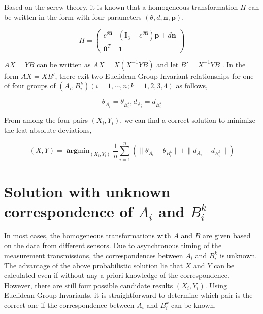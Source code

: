 \documentclass[conference,letterpaper]{IEEEtran}
\begin{document}
Based on the screw theory, it is known that a homogeneous transformation $H$ can be written in the form with four parameters $(\theta,d,\mathbf{n},\mathbf{p})$.

\begin{equation}\label{equ21}
H = \left( \begin{array}{cc}
       e^{\theta \hat{\mathbf{n}}} & (\mathbf{I}_{3} - e^{\theta \hat{\mathbf{n}}})\mathbf{p} + d\mathbf{n} \\
       \mathbf{0}^{T} & \mathbf{1}
\end{array} \right)
\end{equation}

$AX=YB$ can be written as $AX=X(X^{-1}YB)$ and let $B' = X^{-1}YB$ . In the form $AX=XB'$, there exit two Euclidean-Group Invariant relationships for one of four groups of $(A_{i},B_{i}^k)( i = 1,\cdots,n; k=1,2,3,4)$ as follows,

\begin{equation}\label{equ22}
    \theta_{A_{i}}=\theta_{B_{i}^{k}}, d_{A_{i}}=d_{B_{i}^{k}}
\end{equation}

From among the four pairs $(X_{i},Y_{i})$, we can find a correct solution to minimize the leat absolute deviations,

\begin{equation}\label{equ23}
    (X,Y) = \mathop{\mathbf{arg}min}_{(X_{i},Y_{i})}\frac{1}{n} \sum_{i=1}^{n} (\parallel \theta_{A_{i}}-\theta_{B_{i}^{k}} \parallel + \parallel d_{A_{i}}-d_{B_{i}^{k}} \parallel)
\end{equation}

\section{Solution with unknown correspondence of $A_{i}$ and $B_{i}^{k}$}
\label{sect3}

In most cases, the homogeneous transformations with $A$ and $B$ are given based on the data from different sensors. Due to asynchronous timing of the measurement transmissions, the correspondences between $A_{i}$ and $B_{i}^{k}$ is unknown. The advantage of the above probabilistic solution lie that $X$ and $Y$ can be calculated even if without any a priori knowledge of the correspondence. However, there are still four possible candidate results $(X_{i},Y_{i})$. Using Euclidean-Group Invariants, it is straightforward to determine which pair is the correct one if the correspondence between $A_{i}$ and $B_{i}^{k}$   can be known.
\end{document}
